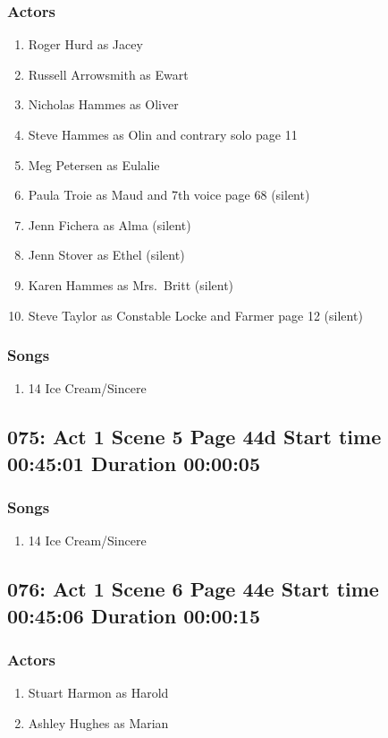 \subsubsection{Actors}
\begin{enumerate}
\item Roger Hurd as Jacey
\item Russell Arrowsmith as Ewart
\item Nicholas Hammes as Oliver
\item Steve Hammes as Olin and contrary solo page 11
\item Meg Petersen as Eulalie
\item Paula Troie as Maud and 7th voice page 68 (silent)
\item Jenn Fichera as Alma (silent)
\item Jenn Stover as Ethel (silent)
\item Karen Hammes as Mrs.~Britt (silent)
\item Steve Taylor as Constable Locke and Farmer page 12 (silent)
\end{enumerate}

\subsubsection{Songs}
\begin{enumerate}
\item 14 Ice Cream/Sincere
\end{enumerate}
\subsection{075: Act 1 Scene 5 Page 44d Start time 00:45:01 Duration 00:00:05}
\subsubsection{Songs}
\begin{enumerate}
\item 14 Ice Cream/Sincere
\end{enumerate}
\subsection{076: Act 1 Scene 6 Page 44e Start time 00:45:06 Duration 00:00:15}

\subsubsection{Actors}
\begin{enumerate}
\item Stuart Harmon as Harold
\item Ashley Hughes as Marian
\end{enumerate}

